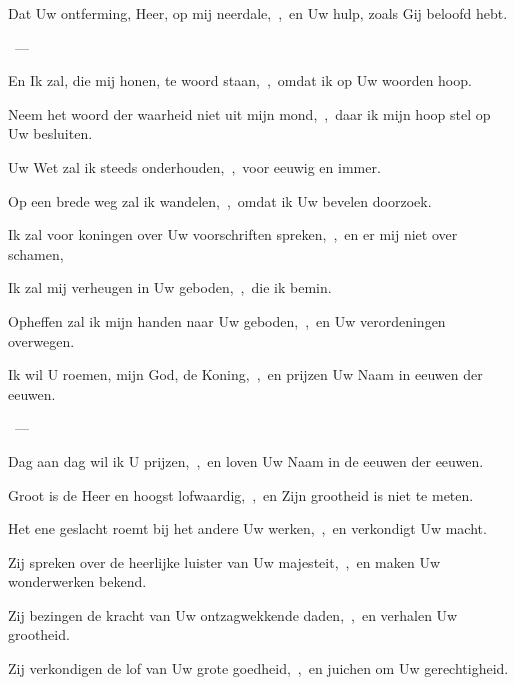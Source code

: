 \documentclass[12pt,twoside,a5paper]{article}
\begin{document}

\begin{halfparskip}
  Dat Uw ontferming, Heer, op mij neerdale,~\sep\ en Uw hulp, zoals Gij beloofd hebt.

  ~--- 

  En Ik zal, die mij honen, te woord staan,~\sep\ omdat ik op Uw woorden hoop.

  Neem het woord der waarheid niet uit mijn mond,~\sep\ daar ik mijn hoop stel op Uw besluiten.

  Uw Wet zal ik steeds onderhouden,~\sep\ voor eeuwig en immer.

  Op een brede weg zal ik wandelen,~\sep\ omdat ik Uw bevelen doorzoek.

  Ik zal voor koningen over Uw voorschriften spreken,~\sep\ en er mij niet over schamen,

  Ik zal mij verheugen in Uw geboden,~\sep\ die ik bemin.

  Opheffen zal ik mijn handen naar Uw geboden,~\sep\ en Uw verordeningen overwegen.
\end{halfparskip}


\begin{halfparskip}
  Ik wil U roemen, mijn God, de Koning,~\sep\ en prijzen Uw Naam in eeuwen der eeuwen.

  ~--- 

  Dag aan dag wil ik U prijzen,~\sep\ en loven Uw Naam in de eeuwen der eeuwen.

  Groot is de Heer en hoogst lofwaardig,~\sep\ en Zijn grootheid is niet te meten.

  Het ene geslacht roemt bij het andere Uw werken,~\sep\ en verkondigt Uw macht.

  Zij spreken over de heerlijke luister van Uw majesteit,~\sep\ en maken Uw wonderwerken bekend.

  Zij bezingen de kracht van Uw ontzagwekkende daden,~\sep\ en verhalen Uw grootheid.

  Zij verkondigen de lof van Uw grote goedheid,~\sep\ en juichen om Uw gerechtigheid.
\end{halfparskip}

\end{document}
